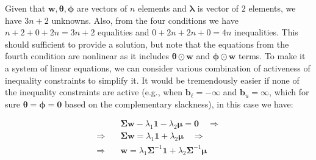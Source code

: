 \documentclass{beamer}
\begin{document}
\begin{frame}

\justifying
Given that $\mathbf{w}, \boldsymbol\theta, \boldsymbol\phi$ are vectors of $n$ elements and $\boldsymbol\lambda$ is vector of $2$ elements, we have $3n+2$ unknowns. Also, from the four conditions we have $n+2+0+2n=3n+2$ equalities and $0+2n+2n+0=4n$ inequalities. This should sufficient to provide a solution, but note that the equations from the fourth condition are nonlinear as it includes $\boldsymbol\theta \odot \mathbf{w}$ and $\boldsymbol\phi \odot \mathbf{w}$ terms. To make it a system of linear equations, we can consider various combination of activeness of inequality constraints to simplify it. It would be tremendously easier if none of the inequality constraints are active (e.g., when $\mathbf{b}_{\ell} = -\boldsymbol\infty$ and $\mathbf{b}_{u} = \boldsymbol\infty$, which for sure $\boldsymbol\theta=\boldsymbol\phi=\mathbf{0}$ based on the complementary slackness), in this case we have:

\justifying
\begin{equation*}
\begin{aligned}
	& \mathbf{\Sigma}\mathbf{w} - \lambda_{1} \mathbf{1} - \lambda_{2} \boldsymbol\mu = \mathbf{0} \quad \Rightarrow \\
	\Rightarrow \quad & \mathbf{\Sigma}\mathbf{w} = \lambda_{1} \mathbf{1} + \lambda_{2} \boldsymbol\mu \quad \Rightarrow \\
	\Rightarrow \quad & \mathbf{w} = \lambda_{1} \mathbf{\Sigma}^{-1}\mathbf{1} + \lambda_{2} \mathbf{\Sigma}^{-1}\boldsymbol\mu \\
\end{aligned}
\end{equation*}



\end{frame}
\end{document}
